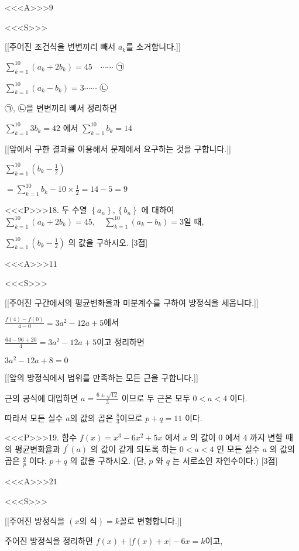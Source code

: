 \documentclass{oblivoir}
\begin{document}
<<<A>>>$9$

<<<S>>>

[[주어진 조건식을 변변끼리 빼서 $a_{k}$를 소거합니다.]]

$ \sum_{k=1}^{10}\left(a_{k}+2 b_{k}\right)=45 \quad \cdots \cdots$ ㉠

$\sum_{k=1}^{10}\left(a_{k}-b_{k}\right)=3 \cdots \cdots$ ㉡

㉠, ㉡을 변변끼리 빼서 정리하면

$\sum_{k=1}^{10} 3 b_{k}=42$ 에서 $\sum_{k=1}^{10} b_{k}=14$

[[앞에서 구한 결과를 이용해서 문제에서 요구하는 것을 구합니다.]]

$ \sum_{k=1}^{10}\left(b_{k}-\frac{1}{2}\right) $

$=\sum_{k=1}^{10} b_{k}-10 \times \frac{1}{2}=14-5=9 $

<<<P>>>18. 두 수열 $\left\{a_{n}\right\},\left\{b_{n}\right\}$ 에 대하여 $\sum_{k=1}^{10}\left(a_{k}+2 b_{k}\right)=45, \quad \sum_{k=1}^{10}\left(a_{k}-b_{k}\right)=3$일 때,

$\sum_{k=1}^{10}\left(b_{k}-\frac{1}{2}\right)$ 의 값을 구하시오. [3점]

<<<A>>>$11$

<<<S>>>

[[주어진 구간에서의 평균변화율과 미분계수를 구하여 방정식을 세웁니다.]]

$ \frac{f(4)-f(0)}{4-0}=3 a^{2}-12 a+5$에서

$\frac{64-96+20}{4}=3 a^{2}-12 a+5 $이고 정리하면

$3 a^{2}-12 a+8=0$

[[앞의 방정식에서 범위를 만족하는 모든 근을 구합니다.]]

근의 공식에 대입하면 $a=\frac{6 \pm \sqrt{12}}{3}$ 이므로 두 근은 모두 $0<a<4$ 이다.

따라서 모든 실수 $a$의 값의 곱은 $\frac{8}{3}$이므로 $p+q=11$ 이다.


<<<P>>>19. 함수 $f(x)=x^{3}-6 x^{2}+5 x$ 에서 $x$ 의 값이 0 에서 4 까지 변할 때의 평균변화율과 $f^{\prime}(a)$ 의 값이 같게 되도록 하는 $0<a<4$ 인 모든 실수 $a$ 의 값의 곱은 $\frac{q}{p}$ 이다. $p+q$ 의 값을 구하시오. (단, $p$ 와 $q$ 는 서로소인 자연수이다.) [3점]

<<<A>>>$21$

<<<S>>>

[[주어진 방정식을 $(x\text{의 식})=k$꼴로 변형합니다.]]

주어진 방정식을 정리하면 $f(x)+ \left| f(x)+x \right| -6x =k$이고,
\end{document}

